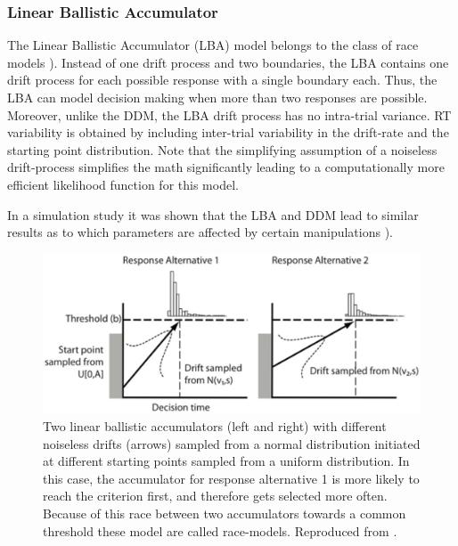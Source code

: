 \documentclass[letterpaper,10pt,english]{article}
\begin{document}
\subsubsection*{Linear Ballistic Accumulator}
\label{methods:linear-ballistic-accumulator}
The Linear Ballistic Accumulator (LBA) model belongs to the class of
race models \citep{BrownHeathcote08}). Instead of one drift process
and two boundaries, the LBA contains one drift process for each
possible response with a single boundary each. Thus, the LBA can model
decision making when more than two responses are possible. Moreover,
unlike the DDM, the LBA drift process has no intra-trial variance. RT
variability is obtained by including inter-trial variability in the
drift-rate and the starting point distribution. Note that the
simplifying assumption of a noiseless drift-process simplifies the
math significantly leading to a computationally more efficient
likelihood function for this model.

In a simulation study it was shown that the LBA and DDM lead to
similar results as to which parameters are affected by certain
manipulations \citep{DonkinBrownHeathcoteEtAl11}).
\begin{figure}[htbp]
\centering
\capstart

\includegraphics[scale=.6]{lba.png}
\caption{Two linear ballistic accumulators (left and right) with different
noiseless drifts (arrows) sampled from a normal distribution
initiated at different starting points sampled from a uniform
distribution. In this case, the accumulator for response
alternative 1 is more likely to reach the criterion first, and
therefore gets selected more often. Because of this race between
two accumulators towards a common threshold these model are called
race-models. Reproduced from \citep{DonkinBrownHeathcoteEtAl11}.}\end{figure}
\end{document}
